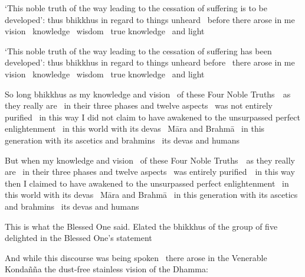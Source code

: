 \begin{english-only-hang}
  `This noble truth of the way leading to the cessation of suffering is to be developed': thus bhikkhus  in regard to things unheard \breathmark\ before there arose in me vision \breathmark\ knowledge \breathmark\ wisdom \breathmark\ true knowledge \breathmark\ and light
\end{english-only-hang}

\begin{english-only-hang}
  `This noble truth of the way leading to the cessation of suffering has been developed': thus bhikkhus  in regard to things unheard before \breathmark\ there arose in me vision \breathmark\ knowledge \breathmark\ wisdom \breathmark\ true knowledge \breathmark\ and light
\end{english-only-hang}

\begin{english-only-hang}
  So long bhikkhus as my knowledge and vision \breathmark\ of these Four Noble \mbox{Truths}~\breathmark\ as they really are \breathmark\ in their three phases and twelve aspects \breathmark\ was not entirely purified \breathmark\ in this way I did not claim to have awakened to the unsurpassed perfect enlightenment \breathmark\ in this world with its devas \breathmark\ Māra and Brahmā \breathmark\ in this generation with its ascetics and brahmins \breathmark\ its devas and humans
\end{english-only-hang}

\begin{english-only-hang}
  But when my knowledge and vision \breathmark\ of these Four Noble \mbox{Truths}~\breathmark\ as they really are \breathmark\ in their three phases and twelve aspects \breathmark\ was entirely \mbox{purified}~\breathmark\ in this way then I claimed to have awakened to the unsurpassed perfect enlightenment \breathmark\ in this world with its devas \breathmark\ Māra and Brahmā \breathmark\ in this generation with its ascetics and brahmins \breathmark\ its devas and humans
\end{english-only-hang}

\begin{english-only-hang}
  This is what the Blessed One said. Elated the bhikkhus of the group of five delighted in the Blessed One's statement
\end{english-only-hang}

\begin{english-only-hang}
  And while this discourse was being spoken \breathmark\ there arose in the Venerable Kondañña the dust-free stainless vision of the Dhamma:
\end{english-only-hang}


